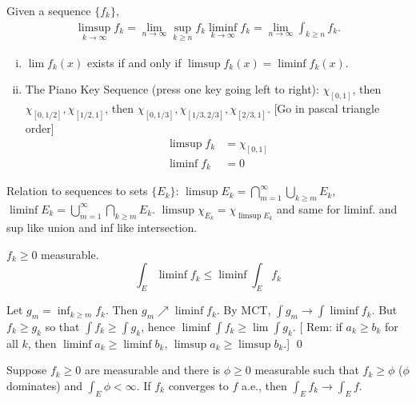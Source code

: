 \begin{dfn}
Given a sequence $\{f_k\}$,
	\[
	\begin{split}
	\limsup_{k \to \infty} f_k = \lim_{n \to \infty} \sup_{k \geq n} f_k
	\liminf_{k \to \infty} f_k = \lim_{n \to \infty} \int_{k \geq n} f_k.
	\end{split}
	\]
\end{dfn}


\begin{ex}
\begin{enumerate}[(i)]
\item $\lim f_k(x)$ exists if and only if $\limsup f_k(x)= \liminf f_k(x)$. 
\item The Piano Key Sequence (press one key going left to right): $\chi_{[0,1]}$, then $\chi_{[0,1/2]}, \chi_{[1/2,1]}$, then $\chi_{[0,1/3]}, \chi_{[1/3,2/3]}, \chi_{[2/3,1]}$. [Go in pascal triangle order]
	\[
	\begin{split}
	\limsup f_k&= \chi_{[0,1]} \\
	\liminf f_k&= 0
	\end{split}
	\]
\end{enumerate}
\end{ex}


\begin{rem}
Relation to sequences to sets $\{E_k\}$: $\limsup E_k= \bigcap_{m=1}^\infty \bigcup_{k \geq m} E_k$, $\liminf E_k= \bigcup_{m=1}^\infty \bigcap_{k \geq m} E_k$. $\limsup \chi_{E_k}= \chi_{\limsup E_k}$ and same for liminf. and sup like union and inf like intersection. 
\end{rem}


\begin{lem}[Fatou]
$f_k \geq 0$ measurable.
\[ \int_E \liminf f_k \leq \liminf \int_E f_k \]
\end{lem}

\pf Let $g_m= \inf_{k \geq m} f_k$. Then $g_m \nearrow \liminf f_k$. By MCT, $\int g_m \to \int \liminf f_k$. But $f_k \geq g_k$ so that $\int f_k \geq \int g_k$, hence $\liminf \int f_k \geq \lim \int g_k$. [ Rem: if $a_k \geq b_k$ for all $k$, then $\liminf a_k \geq \liminf b_k$, $\limsup a_k \geq \limsup b_k$.] \qed \\


\begin{thm}
Suppose $f_k \geq 0$ are measurable and there is $\phi \geq 0$ measurable such that $f_k \geq \phi$ ($\phi$ dominates) and $\int_E \phi< \infty$. If $f_k$ converges to $f$ a.e., then $\int_E f_k \to \int_E f$. 
\end{thm}

